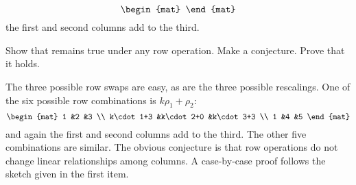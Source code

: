 \begin{exercises}
\begin{equation*}
\begin{mat}
      \end{mat}
    \end{equation*}
    the first and second columns add to the third.
    \begin{exparts}
      \partsitem Show that remains true under any row operation.
      \partsitem Make a conjecture.
      \partsitem Prove that it holds.
    \end{exparts}
    \begin{answer}
      \begin{exparts}
        \partsitem The three possible row swaps are easy, 
          as are the three possible rescalings.
          One of the six possible row combinations is \( k\rho_1+\rho_2 \):
          \begin{equation*}
            \begin{mat}
              1           &2           &3  \\
              k\cdot 1+3  &k\cdot 2+0  &k\cdot 3+3  \\
              1           &4           &5
            \end{mat}
          \end{equation*}
          and again the first and second columns add to the third.
          The other five combinations are similar.
        \partsitem The obvious conjecture is that row operations do not change
          linear relationships among columns.
        \partsitem A case-by-case 
          proof follows the sketch given in the first item.
      \end{exparts}  
   \end{answer}
\end{exercises}
